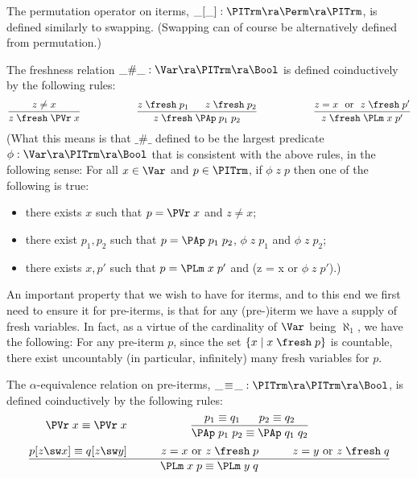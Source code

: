 \medskip
The permutation operator on iterms, $\_[\_] : \PITrm \ra \Perm \ra \PITrm$, is defined similarly to swapping. (Swapping can of course be alternatively defined from permutation.)

\medskip
The freshness relation $\_ \# \_ : \Var \ra \PITrm \ra \Bool$ is defined coinductively by the following rules:
%
$$
\frac{z\not= x}
{z \;\fresh\;\PVr\;x}
%
\hspace*{13ex}
%
\frac{z \;\fresh\;p_1 \;\;\;\;\;\; z \;\fresh\;p_2}
{z \;\fresh\;\PAp\;p_1\;p_2}
%
\hspace*{13ex}
%
\frac{z = x \mbox{ \ or \ } z \;\fresh\;p'}
{z \;\fresh\;\PLm\;x\;p'}
$$
%
(What this means is that $\_\#\_$ defined to be the largest predicate $\phi: \Var \ra \PITrm \ra \Bool$ that is consistent with the above rules, in the following sense: For all $x\in\Var$ and $p\in\PITrm$, if $\phi\;z\;p$ then one of the following is true:
\begin{itemize}
	\item there exists $x$ such that $p=\PVr\;x$ and $z\not=x$;
	\item there exist $p_1,p_2$ such that $p= \PAp\;p_1\;p_2$, 
	$\phi\;z\;p_1$ and $\phi\;z\;p_2$; 
	\item there exists $x,p'$ such that $p= \PLm\;x\;p'$ 
	and (z = x or $\phi\;z\;p'$).)
\end{itemize}


\medskip
An important property that we wish to have for iterms, and to this end we first need to ensure it for pre-iterms, is that for any (pre-)iterm we have a supply of fresh variables. In fact, as a virtue of the cardinality of $\Var$ being $\aleph_1$, we have the following: For any pre-iterm $p$, since the set $\{x \mid x\;\fresh\;p\}$ is countable, there exist uncountably (in particular, infinitely) many fresh variables for $p$. 


\medskip
The $\alpha$-equivalence relation on pre-iterms, $\_ \!\equiv\!\_ : \PITrm \ra \PITrm \ra \Bool$, is defined coinductively by the following rules:
%
$$
\PVr\;x \equiv \PVr\;x
%
\hspace*{13ex}
%
\frac{p_1 \equiv q_1 \;\;\;\;\;\; p_2 \equiv q_2 }
{\PAp\;p_1\;p_2 \equiv \PAp\;q_1\;q_2}
%
\hspace*{13ex}
%
$$
%
\vspace*{0.5ex}
%
$$
\frac{
	p[z\sw x] \equiv q[z\sw y] 
\hspace*{7ex}	
	z = x \mbox{ or } z \;\fresh\;p
\hspace*{7ex}
   z = y \mbox{ or } z \;\fresh\;q
}
{\PLm\;x\;p \equiv \PLm\;y\;q}
$$
%

